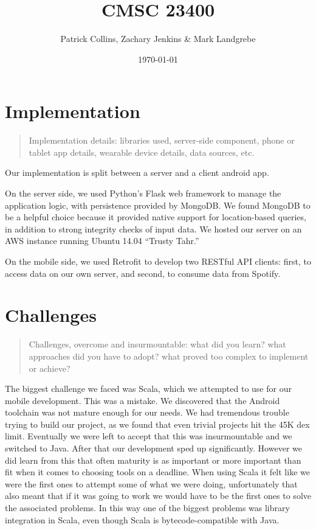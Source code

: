 \documentclass[12pt]{article}
\begin{document}
\title{CMSC 23400}
\author{Patrick Collins, Zachary Jenkins \& Mark Landgrebe}
\date{\today}
\maketitle
\pagebreak

\section{Implementation}

\begin{quote}
  Implementation details: libraries used, server-side component, phone
  or tablet app details, wearable device details, data sources, etc.
\end{quote}

Our implementation is split between a server and a client android
app.

On the server side, we used Python's Flask web framework to manage the
application logic, with persistence provided by MongoDB. We found
MongoDB to be a helpful choice because it provided native support for
location-based queries, in addition to strong integrity checks of
input data. We hosted our server on an AWS instance running Ubuntu
14.04 ``Trusty Tahr.''

On the mobile side, we used Retrofit to develop two RESTful API
clients: first, to access data on our own server, and second, to
consume data from Spotify.

\pagebreak
\section{Challenges}

\begin{quote}
  Challenges, overcome and insurmountable: what did you learn? what
  approaches did you have to adopt? what proved too complex to
  implement or achieve?
\end{quote}

The biggest challenge we faced was Scala, which we attempted to use
for our mobile development. This was a mistake. We discovered that the
Android toolchain was not mature enough for our needs. We had
tremendous trouble trying to build our project, as we found that even
trivial projects hit the 45K dex limit. Eventually we were left to
accept that this was insurmountable and we switched to Java. After
that our development sped up significantly. However we did learn from
this that often maturity is as important or more important than fit
when it comes to choosing tools on a deadline. When using Scala it
felt like we were the first ones to attempt some of what we were
doing, unfortunately that also meant that if it was going to work we
would have to be the first ones to solve the associated problems. In
this way one of the biggest problems was library integration in Scala,
even though Scala is bytecode-compatible with Java.
\end{document}
